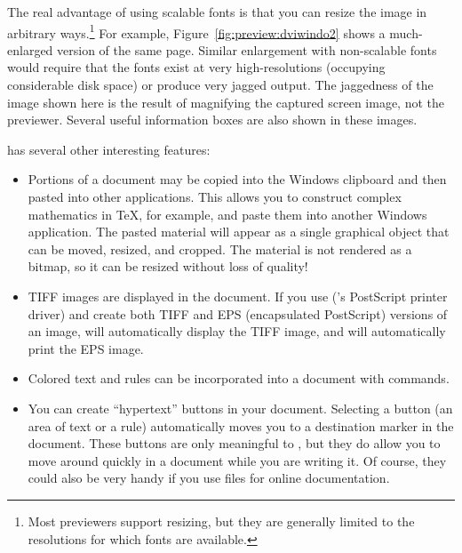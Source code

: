 The real advantage of using scalable fonts is that you can resize the
image in arbitrary ways.\footnote{Most previewers support resizing, but they
are generally limited to the resolutions for which  fonts are
available.}
For example,
Figure~\ref{fig:preview:dviwindo2}
shows a much-enlarged version of
the same page.  Similar enlargement with non-scalable fonts would
require that the  fonts exist at very high-resolutions
(occupying considerable disk space) or produce very jagged output.
The jaggedness of the image shown here is the result of
magnifying the captured screen image, not the previewer.  Several
useful information boxes are also shown in these images.


 has several other interesting features:

\begin{itemize}
  \item Portions of a document may be copied into the Windows clipboard 
    and then pasted into other applications.  This allows you to construct
    complex mathematics in \TeX, for example, and paste them into another
    Windows application.  The pasted material will appear as a single
    graphical object that can be moved, resized, and cropped.  The material
    is not rendered as a bitmap, so it can be resized without loss of quality!

  \item TIFF images are displayed in the document.  If you use
      (\YY's PostScript printer driver) and create both
     TIFF and EPS (encapsulated PostScript) versions of an image,
      will automatically display the TIFF image, and
      will automatically print the EPS image.

  \item Colored text and rules can be incorporated into a document with
     commands.
\newpage
  \item You can create ``hypertext'' buttons in your document.  Selecting a 
    button (an area of text or a rule) automatically moves you to a destination
    marker in the document.  These buttons
    are only meaningful to , but they do allow you to move
    around quickly in a document while you are writing it.  Of course, they
    could also be very handy if you use  files for online
    documentation.  
\end{itemize}

